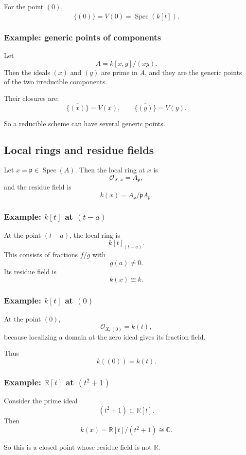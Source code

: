 \documentclass[12pt,a4paper]{article}
\theoremstyle{notespace}
\newcommand{\Spec}{\operatorname{Spec}}
\newcommand{\OO}{\mathcal O}
\newcommand{\mf}{\mathfrak}
\theoremstyle{definition}
\begin{document}
For the point \((0)\),
\[
\overline{\{(0)\}}=V(0)=\Spec(k[t]).
\]

\subsubsection{Example: generic points of components}

Let
\[
A=k[x,y]/(xy).
\]
Then the ideals \((x)\) and \((y)\) are prime in \(A\), and they are the generic points of the two irreducible components.

Their closures are:
\[
\overline{\{(x)\}}=V(x),
\qquad
\overline{\{(y)\}}=V(y).
\]

So a reducible scheme can have several generic points.

\subsection{Local rings and residue fields}

Let \(x=\mf p\in \Spec(A)\). Then the local ring at \(x\) is
\[
\OO_{X,x}=A_{\mf p},
\]
and the residue field is
\[
k(x)=A_{\mf p}/\mf p A_{\mf p}.
\]

\subsubsection{Example: \(k[t]\) at \((t-a)\)}

At the point \((t-a)\), the local ring is
\[
k[t]_{(t-a)}.
\]
This consists of fractions \(f/g\) with
\[
g(a)\neq 0.
\]
Its residue field is
\[
k(x)\cong k.
\]

\subsubsection{Example: \(k[t]\) at \((0)\)}

At the point \((0)\),
\[
\OO_{X,(0)}=k(t),
\]
because localizing a domain at the zero ideal gives its fraction field.

Thus
\[
k((0))=k(t).
\]

\subsubsection{Example: \(\mathbb R[t]\) at \((t^2+1)\)}

Consider the prime ideal
\[
(t^2+1)\subset \mathbb R[t].
\]
Then
\[
k(x)=\mathbb R[t]/(t^2+1)\cong \mathbb C.
\]

So this is a closed point whose residue field is not \(\mathbb R\).
\end{document}
